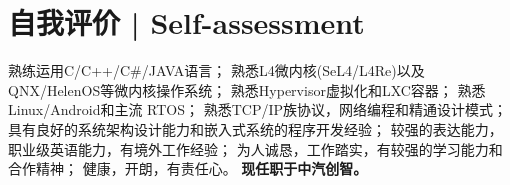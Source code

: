 \documentclass{resume}
\begin{document}




\begin{onehalfspacing}
\end{onehalfspacing}
 
\section{自我评价 | Self-assessment}
熟练运用C/C++/C\#/JAVA语言；\newline
熟悉L4微内核(SeL4/L4Re)以及QNX/HelenOS等微内核操作系统；\newline
熟悉Hypervisor虚拟化和LXC容器；\newline
熟悉Linux/Android和主流 RTOS；\newline
熟悉TCP/IP族协议，网络编程和精通设计模式；\newline
具有良好的系统架构设计能力和嵌入式系统的程序开发经验；\newline
较强的表达能力，职业级英语能力，有境外工作经验；\newline
为人诚恳，工作踏实，有较强的学习能力和合作精神；\newline
健康，开朗，有责任心。\newline
\textbf{现任职于中汽创智。}

\end{document}
